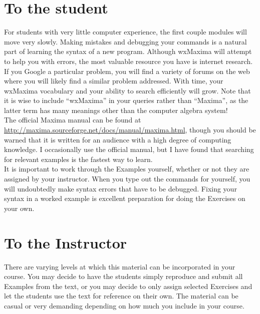 \documentclass[10.5pt,twoside]{report}
\theoremstyle{definition}
\begin{document}
\pagebreak

\section*{\large{To the student}}

For students with very little computer experience, the first couple modules will move very slowly.  Making mistakes and debugging your commands is a natural part of learning the syntax of a new program.  Although wxMaxima will attempt to help you with errors, the most valuable resource you have is internet research.  If you Google a particular problem, you will find a variety of forums on the web where you will likely find a similar problem addressed.  With time, your wxMaxima vocabulary and your ability to search efficiently will grow.  Note that it is wise to include ``wxMaxima'' in your queries rather than ``Maxima'', as the latter term has many meanings other than the computer algebra system! \\

The official Maxima manual can be found at \url{http://maxima.sourceforge.net/docs/manual/maxima.html}, though you 
should be warned that it is written for an audience with a high degree
of computing knowledge.  I occasionally use the official manual, but I have found that searching for relevant examples is the fastest way to learn.\\

It is important to work through the Examples yourself, whether or not they are assigned by your instructor.  When you type out the commands for yourself, you will undoubtedly make syntax errors that have to be debugged.  Fixing your syntax in a worked example is excellent preparation for doing the Exercises on your own.\\


\section*{\large{To the Instructor}}

There are varying levels at which this material can be incorporated in your course.  You may decide to have the students simply reproduce and submit all Examples from the text, or you may decide to only assign selected Exercises and let the students use the text for reference on their own.  The material can be casual or very demanding depending on how much you include in your course. \\
\end{document}
